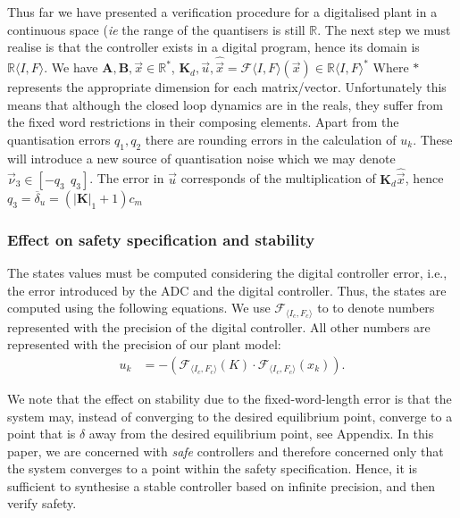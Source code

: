 \documentclass[runningheads,a4paper]{llncs}
\newcommand{\mat}[1]{\boldsymbol{#1}}
\begin{document}

Thus far we have presented a verification procedure for a digitalised plant in a continuous space (\emph{ie} the
range of the quantisers is still $\mathbb{R}$. The next step we must realise is that the controller 
exists in a digital program, hence its domain is $\mathbb{R}\langle I,F\rangle$. We have $\mat{A},\mat{B},\vec{x} \in \mathbb{R}^*$, $\mat{K}_d,\vec{u},\hat{\vec{x}}=\mathcal{F}\langle I,F \rangle(\vec{x}) \in \mathbb{R}\langle I,F\rangle^*$
Where $*$ represents the appropriate dimension for each matrix/vector.
Unfortunately this means that although the closed loop dynamics are in the reals, they suffer from
the fixed word restrictions in their composing elements.
Apart from the quantisation errors $q_1,q_2$ there are rounding errors in the calculation of $u_k$. 
These will introduce a new source of quantisation noise which we may denote $\vec{\nu}_3 \in [-q_3\ \ q_3]$.
The error in $\vec{u}$ corresponds of the multiplication of $\mat{K}_d\hat{\vec{x}}$, hence $q_3=\overline{\delta}_u=(|\mat{K}|_1+1)c_m$

\bigskip

\subsubsection{Effect on safety specification and stability}
The states values must be computed considering the digital controller error, i.e., the error introduced by the ADC and the digital controller. 
Thus, the states are computed using the following equations. We use $\mathcal{F}_{\langle I_c,F_c \rangle}$ 
to to denote numbers represented with the precision of the digital controller. All other numbers
are represented with the precision of our plant model:
%
\begin{align*}
u_{k}&=-(\mathcal{F}_{\langle I_c,F_c \rangle}(K)\cdot\mathcal{F}_{\langle I_c,F_c \rangle}(x_{k})).  
\end{align*}

We note that the effect on stability due to the fixed-word-length error is that the system may, instead of converging to the desired equilibrium point, converge to a point that is $\delta$ away from the desired equilibrium point, see Appendix. In this paper, we are concerned with \emph{safe} controllers and therefore concerned only that the system converges to a point within the safety specification. Hence, it is sufficient to synthesise a stable controller based on infinite precision, and then verify safety. 
\end{document}
